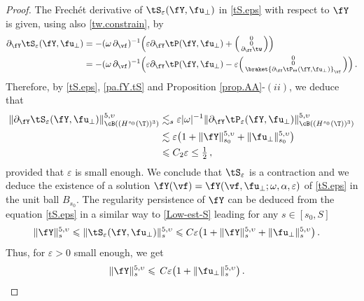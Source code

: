 \documentclass[a4paper,reqno,10pt]{article}
\newcommand{\pa}{\partial}
\begin{document}
\begin{proof}
	The Frech\'et derivative of $\tS_{\varepsilon}(\fY,\fu_{\perp})$ in \eqref{tS.eps} with respect to $\fY$ is given, using also \eqref{tw.constrain}, by
	\begin{align}
		\pa_{\fY} \tS_{\varepsilon}(\fY,\fu_{\perp}) & =  - (\omega\,\pa_{\vf})^{-1} \Big( \varepsilon \pa_{\fY}\tP(\fY,\fu_{\perp}) + \Big(\begin{smallmatrix}
			0  \\ 0 \\ \pa_{\fY}\tw
		\end{smallmatrix}\Big) \Big) \\
		&  =  - (\omega\,\pa_{\vf})^{-1} \Big( \varepsilon \pa_{\fY}\tP(\fY,\fu_{\perp}) -\varepsilon \Big(\begin{smallmatrix}
			0  \\ 0 \\ \braket{ \pa_{\fY} \tP_{\Theta}(\fY,\fu_{\perp}) }_{\vf}
		\end{smallmatrix}\Big) \Big)  \,. \label{pa.fY.tS}
	\end{align}
	Therefore, by \eqref{tS.eps}, \eqref{pa.fY.tS} and Proposition \ref{prop.AA}-$(ii)$, we deduce that
	\begin{align}
		\| \pa_{\fY} \tS_{\varepsilon}(\fY,\fu_{\perp}) \|_{\cB((H^{s_0}(\T))^3)}^{5,\upsilon} & \lesssim_{s} \varepsilon |\omega|^{-1}  \| \pa_{\fY} \tP_{\varepsilon}(\fY,\fu_{\perp}) \|_{\cB((H^{s_0}(\T))^3)}^{5,\upsilon} \\
		& \lesssim \varepsilon  \big( 1+ \| \fY \|_{s_0}^{5,\upsilon} + \| \fu_{\perp}\|_{s_0}^{5,\upsilon} \big) \\
		& \leqslant C_{2} \varepsilon\leq \tfrac12\,, \label{contr.est}
	\end{align}
	provided that $\varepsilon $ is small enough. We conclude that $\tS_{\varepsilon}$ is a contraction and we deduce the existence of a solution $\fY(\vf)= \fY(\vf,\fu_{\perp};\omega,\alpha,\varepsilon)$ of \eqref{tS.eps} in the unit ball $B_{s_0}$. The regularity persistence of $\fY$ can be deduced from the equation \eqref{tS.eps} in a similar way to \eqref{Low-est-S} leading for any $s\in[s_0,S]$
    \begin{align*}
		\| \fY \|_{s}^{5,\upsilon} &\leqslant  \| \tS_{\varepsilon}(\fY,\fu_{\perp}) \|_{s}^{5,\upsilon}  \leqslant C\varepsilon  \big(1+ \| \fY \|_{s}^{5,\upsilon} + \| \fu_{\perp}\|_{s}^{5,\upsilon} \big) \,.
	\end{align*}
Thus,  for  $\varepsilon>0$ small enough, we get 
\begin{align*}
		\| \fY \|_{s}^{5,\upsilon} &\leqslant\,C\varepsilon \big(1+ \| \fu_{\perp}\|_{s}^{5,\upsilon} \big) \,.

\end{align*}
\end{proof}
\end{document}
